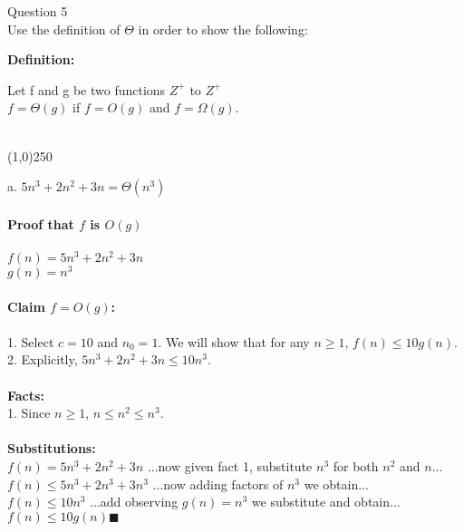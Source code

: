 \documentclass[OPONE]{example}
\begin{document}

\noindent Question 5 \\

Use the definition of $\Theta$ in order to show the following: \\

\begin{list}{}{}
	
	\item {\textbf{Definition:}} 
	
	Let f and g be two functions \textbf{$Z^{+}$} to \textbf{$Z^{+}$} \\ 
	$f = \Theta(g)$ if $f = O(g)$ and $f = \Omega(g)$. \\
	\\
	
	\begin{center}
		\line(1,0){250}
	\end{center}

	\item {a.}  
	$5n^{3} + 2n^{2} + 3n = \Theta(n^{3})$  \\
	\\
	\textbf{Proof that $f$ is $O(g)$} \\ 
	\\
	$f(n) = 5n^{3} + 2n^{2} + 3n$ \\
	$g(n) = n^{3}$ \\
	\\
	\textbf{Claim $f = O(g)$: }\\
	\\
	1. Select $c = 10$ and $n_{0} = 1$.  We will show that for any $n \geq 1$, $f(n) \leq 10g(n)$. \\
	2. Explicitly, $5n^{3} + 2n^{2} + 3n \leq 10n^{3}$.\\
	\\

	\textbf{Facts:} \\
	1. Since $n \geq 1$, $n \leq n^{2} \leq n^{3}$.\\
	\\
	\textbf{Substitutions:} \\
	$f(n) = 5n^{3} + 2n^{2} + 3n$ \hspace{1.06 in} ...now given fact 1, substitute $n^{3}$ for both $n^{2}$ and $n$... \\
	$f(n)  \leq 5n^{3} + 2n^{3} + 3n^{3}$  \hspace{1 in} ...now adding factors of $n^{3}$ we obtain... \\
	$f(n) \leq 10n^{3}$ \hspace{1.682 in} ...add observing $g(n) = n^{3}$ we substitute and obtain... \\
	$f(n) \leq 10g(n)  \blacksquare$ \\
	

\end{list}
\end{document}
